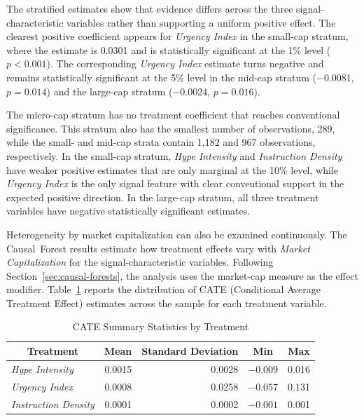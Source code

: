 The stratified estimates show that evidence differs across the three signal-characteristic variables rather than supporting a uniform positive effect. The clearest positive coefficient appears for \textit{Urgency Index} in the small-cap stratum, where the estimate is 0.0301 and is statistically significant at the 1\% level ($p < 0.001$). The corresponding \textit{Urgency Index} estimate turns negative and remains statistically significant at the 5\% level in the mid-cap stratum ($-$0.0081, $p = 0.014$) and the large-cap stratum ($-$0.0024, $p = 0.016$).

The micro-cap stratum has no treatment coefficient that reaches conventional significance. This stratum also has the smallest number of observations, 289, while the small- and mid-cap strata contain 1,182 and 967 observations, respectively. In the small-cap stratum, \textit{Hype Intensity} and \textit{Instruction Density} have weaker positive estimates that are only marginal at the 10\% level, while \textit{Urgency Index} is the only signal feature with clear conventional support in the expected positive direction. In the large-cap stratum, all three treatment variables have negative statistically significant estimates.

Heterogeneity by market capitalization can also be examined continuously. The Causal~Forest results estimate how treatment effects vary with \textit{Market Capitalization} for the signal-characteristic variables. Following Section~\ref{sec:causal-forests}, the analysis uses the market-cap measure as the effect modifier. Table~\ref{tab:cate-summary} reports the distribution of CATE (Conditional Average Treatment Effect) estimates across the sample for each treatment variable.

\begin{table}[htbp]
\centering
\caption{CATE Summary Statistics by Treatment}
\label{tab:cate-summary}
\begin{tabular}{|l|r|r|r|r|}
\toprule
\multicolumn{1}{|c|}{\textbf{Treatment}} & \multicolumn{1}{c|}{\textbf{Mean}} & \multicolumn{1}{c|}{\textbf{Standard Deviation}} & \multicolumn{1}{c|}{\textbf{Min}} & \multicolumn{1}{c|}{\textbf{Max}} \\
\midrule
\textit{Hype Intensity} & 0.0015 & 0.0028 & $-0.009$ & 0.016 \\
\textit{Urgency Index} & 0.0008 & 0.0258 & $-0.057$ & 0.131 \\
\textit{Instruction Density} & 0.0001 & 0.0002 & $-0.001$ & 0.001 \\
\bottomrule
\end{tabular}
\datasetsource
\end{table}

